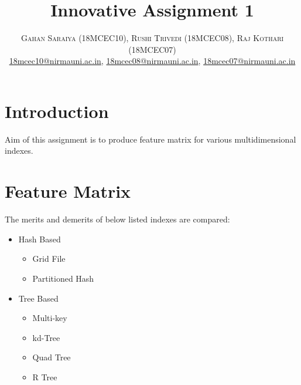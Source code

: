 \documentclass[paper=letter, fontsize=12pt]{article}
\title{\vspace{-15mm}\fontsize{24pt}{10pt}\selectfont\textbf{Innovative Assignment 1}} %
\author{
\large
{\textsc{Gahan Saraiya (18MCEC10), Rushi Trivedi (18MCEC08), Raj Kothari (18MCEC07)}}\\[2mm]
\normalsize \href{mailto:18mcec10@nirmauni.ac.in}{18mcec10@nirmauni.ac.in}, %
\normalsize \href{mailto:18mcec10@nirmauni.ac.in}{18mcec08@nirmauni.ac.in}, %
\normalsize \href{mailto:18mcec10@nirmauni.ac.in}{18mcec07@nirmauni.ac.in}\\[2mm] %
}
\date{}
\begin{document}
\maketitle %
\thispagestyle{fancy} %

\newcommand*\tick{\item[\Checkmark]}
\newcommand*\good{\CheckmarkBold}
\newcommand*\arrow{\item[$\Rightarrow$]}
\newcommand*\fail{\item[\XSolidBrush]}
\newcommand*\bad{\XSolidBrush}

\section{Introduction}
Aim of this assignment is to produce feature matrix for various multidimensional indexes.
\section{Feature Matrix}
The merits and demerits of below listed indexes are compared:
\begin{itemize}
	\item Hash Based
		\begin{itemize}
			\item Grid File
			\item Partitioned Hash
		\end{itemize}
	\item Tree Based
		\begin{itemize}
			\item Multi-key
			\item kd-Tree
			\item Quad Tree
			\item R Tree
		\end{itemize}
\end{itemize}
\end{document}
